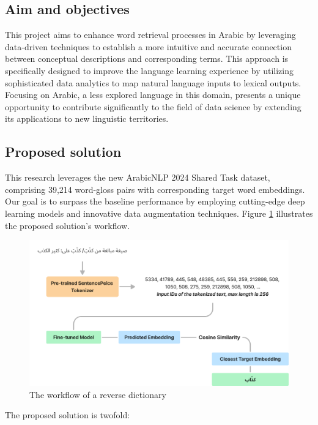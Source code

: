 \documentclass[12.5pt]{article}
\begin{document}
\subsection{Aim and objectives}

This project aims to enhance word retrieval processes in Arabic by leveraging data-driven techniques to establish a more intuitive and accurate connection between conceptual descriptions and corresponding terms. This approach is specifically designed to improve the language learning experience by utilizing sophisticated data analytics to map natural language inputs to lexical outputs. Focusing on Arabic, a less explored language in this domain, presents a unique opportunity to contribute significantly to the field of data science by extending its applications to new linguistic territories.

\subsection{Proposed solution}

This research leverages the new ArabicNLP 2024 Shared Task dataset, comprising 39,214 word-gloss pairs with corresponding target word embeddings. Our goal is to surpass the baseline performance by employing cutting-edge deep learning models and innovative data augmentation techniques. Figure \ref{fig:rd-flow} illustrates the proposed solution's workflow.

\begin{figure}
    \centering
    \captionsetup{justification=centering}
    \includegraphics[width=\textwidth]{rd-flow.png}
    \caption{The workflow of a reverse dictionary}
    \label{fig:rd-flow}
\end{figure}

The proposed solution is twofold:
\end{document}
